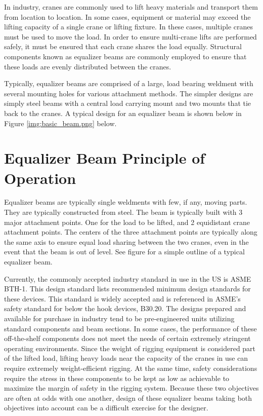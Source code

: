 
In industry, cranes are commonly used to lift heavy materials and transport them from location to location. In some cases, equipment or material may exceed the lifting capacity of a single crane or lifting fixture. In these cases, multiple cranes must be used to move the load. In order to ensure multi-crane lifts are performed safely, it must be ensured that each crane shares the load equally. Structural components known as equalizer beams are commonly employed to ensure that these loads are evenly distributed between the cranes. 

Typically, equalizer beams are comprised of a large, load bearing weldment with several mounting holes for various attachment methods. The simpler designs are simply steel beams with a central load carrying mount and two mounts that tie back to the cranes. A typical design for an equalizer beam is shown below in Figure \ref{img:basic_beam.png} below. 

\section{Equalizer Beam Principle of Operation} 

Equalizer beams are typically single weldments with few, if any, moving parts. They are typically constructed from steel. The beam is typically built with 3 major attachment points. One for the load to be lifted, and 2 equidistant crane attachment points. The centers of the three attachment points are typically along the same axis to ensure equal load sharing between the two cranes, even in the event that the beam is out of level. See figure  for a simple outline of a typical equalizer beam.

Currently, the commonly accepted industry standard in use in the US is ASME BTH-1. This design standard lists recommended minimum design standards for these devices. This standard is widely accepted and is referenced in ASME's safety standard for below the hook devices, B30.20. The designs prepared and available for purchase in industry tend to be pre-engineered units utilizing standard components and beam sections. In some cases, the performance of these off-the-shelf components does not meet the needs of certain extremely stringent operating environments. Since the weight of rigging equipment is considered part of the lifted load, lifting heavy loads near the capacity of the cranes in use can require extremely weight-efficient rigging. At the same time, safety considerations require the stress in these components to be kept as low as achievable to maximize the margin of safety in the rigging system. Because these two objectives are often at odds with one another, design of these equalizer beams taking both objectives into account can be a difficult exercise for the designer. 

